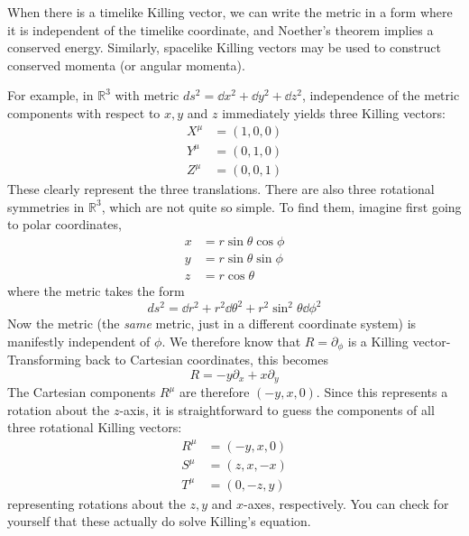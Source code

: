 When there is a timelike Killing vector, we can write the metric in a form where it is independent of the timelike coordinate, and Noether's theorem implies a conserved energy. Similarly, spacelike Killing vectors may be used to construct conserved momenta (or angular momenta).

\begin{tcolorbox}
For example, in $\mathbb{R}^3$ with metric $ds^2=\dd x^2+\dd y^2+\dd z^2$, independence of the metric components with respect to $x, y$ and $z$ immediately yields three Killing vectors:
\begin{align*}
    X^\mu&=(1,0,0)\\
    Y^\mu&=(0,1,0)\\
    Z^\mu&=(0,0,1)
\end{align*}
These clearly represent the three translations. There are also three rotational symmetries in $\mathbb{R}^3$, which are not quite so simple. To find them, imagine first going to polar coordinates,
\begin{align*}
    x&=r\sin\theta\cos\phi\\
    y&=r\sin\theta\sin\phi\\
    z&=r\cos\theta
\end{align*}
where the metric takes the form
\begin{equation*}
    ds^2=\dd r^2+r^2\dd\theta^2+r^2\sin^2\theta\dd \phi^2
\end{equation*}
Now the metric (the \textit{same} metric, just in a different coordinate system) is manifestly independent of $\phi$. We therefore know that $R=\partial_\phi$ is a Killing vector- Transforming back to Cartesian coordinates, this becomes
\begin{equation*}
    R=-y\partial_x +x\partial_y
\end{equation*}
The Cartesian components $R^\mu$ are therefore $(-y,x,0)$. Since this represents a rotation about the $z$-axis, it is straightforward to guess the components of all three rotational Killing vectors:
\begin{align}\label{3.186}
    \nonumber R^\mu&=(-y,x,0)\\
    \nonumber S^\mu&=(z,x,-x)\\
     T^\mu&=(0,-z,y)
\end{align}
representing rotations about the $z, y$ and $x$-axes, respectively. You can check for yourself that these actually do solve Killing's equation.
\end{tcolorbox}

